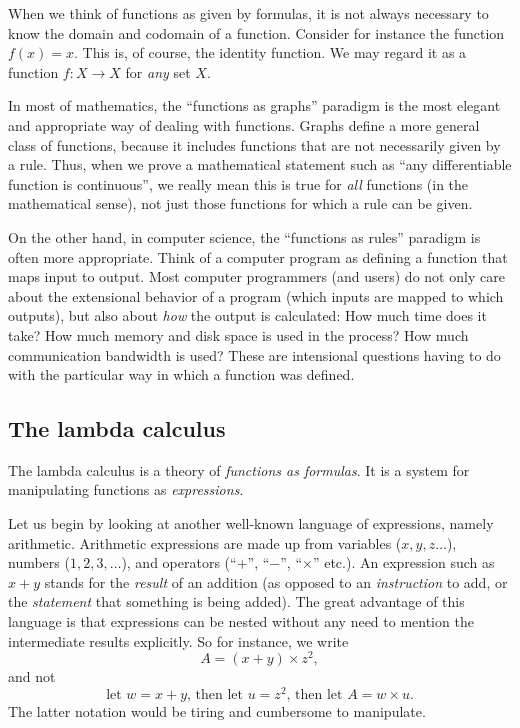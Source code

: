 \documentclass[12pt]{article}
\begin{document}
When we think of functions as given by formulas, it is not always
necessary to know the domain and codomain of a function.  Consider for
instance the function $f(x)=x$. This is, of course, the identity
function. We may regard it as a function $f:X\to X$ for {\em any} set
$X$.

In most of mathematics, the ``functions as graphs'' paradigm is the
most elegant and appropriate way of dealing with functions. Graphs
define a more general class of functions, because it includes
functions that are not necessarily given by a rule. Thus, when we
prove a mathematical statement such as ``any differentiable function
is continuous'', we really mean this is true for {\em all} functions (in
the mathematical sense), not just those functions for which a rule can
be given.

On the other hand, in computer science, the ``functions as rules''
paradigm is often more appropriate. Think of a computer program as
defining a function that maps input to output. Most computer
programmers (and users) do not only care about the extensional
behavior of a program (which inputs are mapped to which outputs), but
also about {\em how} the output is calculated: How much time does it
take? How much memory and disk space is used in the process? How much
communication bandwidth is used? These are intensional questions
having to do with the particular way in which a function was defined.

\subsection{The lambda calculus}

The lambda calculus is a theory of {\em functions as formulas}. It is
a system for manipulating functions as {\em expressions}.  

Let us begin by looking at another well-known language of expressions,
namely arithmetic. Arithmetic expressions are made up from variables
($x,y,z\ldots$), numbers ($1,2,3,\ldots$), and operators (``$+$'',
``$-$'', ``$\times$'' etc.). An expression such as $x+y$ stands for
the {\em result} of an addition (as opposed to an {\em instruction} to
add, or the {\em statement} that something is being added). The great
advantage of this language is that expressions can be nested without
any need to mention the intermediate results explicitly. So for
instance, we write
\[   A = (x+y)\times z^2,   
\]
and not 
\[   \mbox{let $w=x+y$, then let $u=z^2$, then let $A=w\times u$.}    
\]
The latter notation would be tiring and cumbersome to manipulate. 
\end{document}
